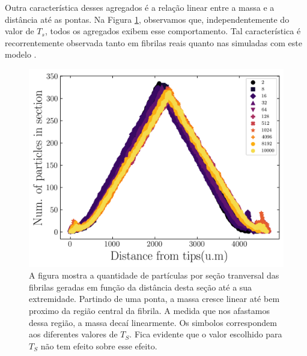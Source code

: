 \documentclass{article}
\begin{document}
    Outra característica desses agregados é a relação linear entre a massa e a distância até as pontas. Na Figura 
    \ref{R2}, observamos que, independentemente do valor de \(T_{s}\), todos os agregados exibem esse comportamento. 
    Tal característica é recorrentemente observada tanto em fibrilas reais quanto nas simuladas com este modelo 
    \cite{Parkinson1995,Kadler1987}. 


    \begin{figure}[H]
        \centering
        \includegraphics[width=\textwidth]{figures/tips.png}

        \caption{A figura mostra a quantidade de partículas por seção tranversal das fibrilas geradas em função da 
        distância desta seção até a sua extremidade. Partindo de uma ponta, a massa cresce linear até bem proximo 
        da região central da fibrila. A medida que nos afastamos dessa região, a massa decaí linearmente. Os simbolos 
        correspondem aos diferentes valores de $T_{S}$. Fica evidente que o valor escolhido para $T_{S}$ não tem 
        efeito sobre esse efeito.} 

        \label{R2}
    \end{figure}
\end{document}
